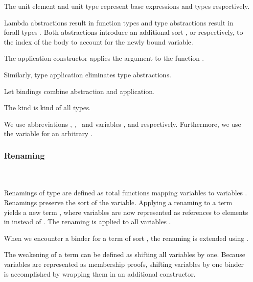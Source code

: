 \noindent The unit element  and unit type  represent base expressions and types respectively. 

\noindent Lambda abstractions   result in function types    and type abstractions   result in forall types  . 
Both abstractions introduce an additional sort , or  respectively, to the index  of the body  to account for the newly bound variable.

\noindent The application constructor    applies the argument  to the function .

\noindent Similarly, type application    eliminates type abstractions. 

\noindent Let bindings     combine abstraction and application. 

\noindent The kind  is kind of all types.

\noindent We use abbreviations \FVar, \FExpr, \FType\ and variables ,  and  respectively. Furthermore, we use the variable  for an arbitrary   .

\subsubsection{Renaming}\hfill\\\\
Renamings  of type    are defined as total functions mapping variables    to variables   . 
Renamings preserve the sort  of the variable.
\FRen
Applying a renaming    to a term    yields a new term   , where variables are now represented as references to elements in  instead of .
\Fren
The renaming is applied to all variables .

\noindent When we encounter a binder for a term of sort , the renaming is extended using \Frenext. 

\noindent The weakening of a term can be defined as shifting all variables by one.
\Fwk 
Because variables are represented as membership proofs, shifting variables by one binder is accomplished by wrapping them in an additional  constructor.

